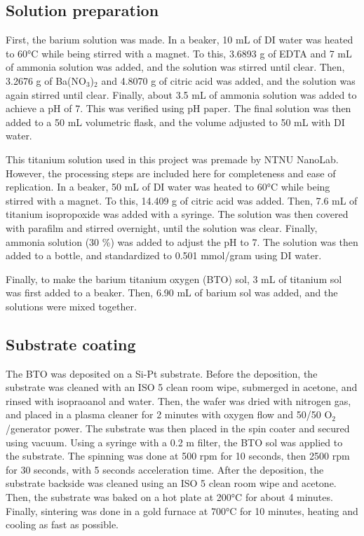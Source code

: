 \subsection{Solution preparation}

\noindent First, the barium solution was made.
In a beaker, 10 mL of DI water was heated to 60°C while being stirred with a magnet.
To this, 3.6893 g of EDTA and 7 mL of ammonia solution was added, and the solution was stirred until clear.
Then, 3.2676 g of Ba(NO$_3$)$_2$ and 4.8070 g of citric acid was added, and the solution was again stirred until clear.
Finally, about 3.5 mL of ammonia solution was added to achieve a pH of 7. 
This was verified using pH paper.
The final solution was then added to a 50 mL volumetric flask, and the volume adjusted to 50 mL with DI water.


This titanium solution used in this project was premade by NTNU NanoLab.
However, the processing steps are included here for completeness and ease of replication.
In a beaker, 50 mL of DI water was heated to 60°C while being stirred with a magnet.
To this, 14.409 g of citric acid was added.
Then, 7.6 mL of titanium isopropoxide was added with a syringe.
The solution was then covered with parafilm and stirred overnight, until the solution was clear.
Finally, ammonia solution (30 \%) was added to adjust the pH to 7.
The solution was then added to a bottle, and standardized to 0.501 mmol/gram using DI water.

Finally, to make the barium titanium oxygen (BTO) sol, 3 mL of titanium sol was first added to a beaker. 
Then, 6.90 mL of barium sol was added, and the solutions were mixed together.

\subsection{Substrate coating}

\noindent The BTO was deposited on a Si-Pt substrate.
Before the deposition, the substrate was cleaned with an ISO 5 clean room wipe, submerged in acetone, and rinsed with isopraoanol and water.
Then, the wafer was dried with nitrogen gas, and placed in a plasma cleaner for 2 minutes with oxygen flow and 50/50 O$_2$/generator power.
The substrate was then placed in the spin coater and secured using vacuum.
Using a syringe with a 0.2 \textmu m filter, the BTO sol was applied to the substrate.
The spinning was done at 500 rpm for 10 seconds, then 2500 rpm for 30 seconds, with 5 seconds acceleration time.
After the deposition, the substrate backside was cleaned using an ISO 5 clean room wipe and acetone.
Then, the substrate was baked on a hot plate at 200°C for about 4 minutes.
Finally, sintering was done in a gold furnace at 700°C for 10 minutes, heating and cooling as fast as possible.

